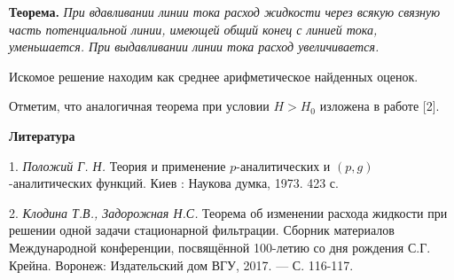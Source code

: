 \textbf{Теорема.} {\it При вдавливании линии тока расход жидкости через всякую
связную часть потенциальной линии, имеющей общий конец с линией тока, уменьшается.
При выдавливании линии тока расход увеличивается.}

Искомое решение находим как среднее арифметическое найденных оценок.

Отметим, что аналогичная теорема при условии $H>H_0$ изложена в работе [2].

\smallskip \centerline {\bf Литература} \nopagebreak

1. {\it Положий Г. Н.} Теория и применение $p$-аналитических
и $(p,g)$-аналитических функций. Киев : Наукова думка, 1973. 423 с.

2. {\it Клодина Т.В., Задорожная Н.С.} Теорема об изменении расхода жидкости при решении
одной задачи стационарной фильтрации. Сборник материалов Международной конференции,
посвящённой 100-летию со дня рождения С.Г. Крейна. Воронеж: Издательский дом ВГУ, 2017. — С. 116-117.
